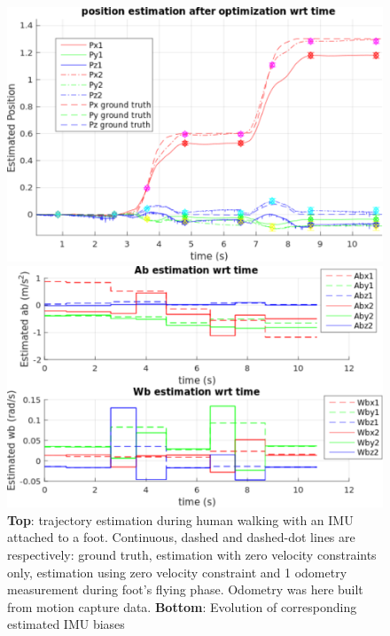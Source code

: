 \begin{figure}[tb]
\centering
\includegraphics[scale=0.5]{figures/Result_position}
\par\vspace{4mm}
\includegraphics[scale=0.5]{figures/Result_bias}
\caption{ 
{\bf Top}: trajectory estimation during human walking with an IMU attached to a foot. Continuous, dashed and dashed-dot lines are respectively: ground truth, 
estimation with zero velocity constraints only, estimation using zero velocity constraint and 1 odometry measurement during foot's flying phase. Odometry was here built from motion capture data.
{\bf Bottom}: Evolution of corresponding estimated IMU biases 
}
\label{fig:forward_walk_IRI}
\end{figure}

